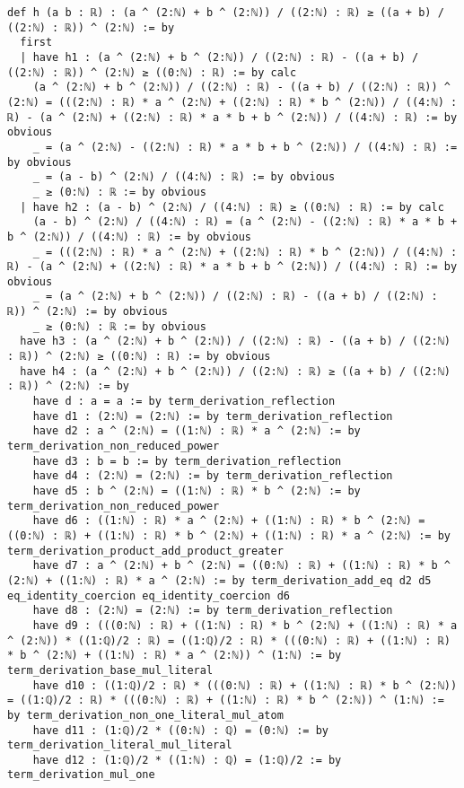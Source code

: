 \documentclass{article}
\begin{document}
\begin{tcolorbox}[colback=white!10, width=\linewidth]
\begin{lstlisting}[language=Lean4]
def h (a b : ℝ) : (a ^ (2:ℕ) + b ^ (2:ℕ)) / ((2:ℕ) : ℝ) ≥ ((a + b) / ((2:ℕ) : ℝ)) ^ (2:ℕ) := by
  first
  | have h1 : (a ^ (2:ℕ) + b ^ (2:ℕ)) / ((2:ℕ) : ℝ) - ((a + b) / ((2:ℕ) : ℝ)) ^ (2:ℕ) ≥ ((0:ℕ) : ℝ) := by calc
    (a ^ (2:ℕ) + b ^ (2:ℕ)) / ((2:ℕ) : ℝ) - ((a + b) / ((2:ℕ) : ℝ)) ^ (2:ℕ) = (((2:ℕ) : ℝ) * a ^ (2:ℕ) + ((2:ℕ) : ℝ) * b ^ (2:ℕ)) / ((4:ℕ) : ℝ) - (a ^ (2:ℕ) + ((2:ℕ) : ℝ) * a * b + b ^ (2:ℕ)) / ((4:ℕ) : ℝ) := by obvious
    _ = (a ^ (2:ℕ) - ((2:ℕ) : ℝ) * a * b + b ^ (2:ℕ)) / ((4:ℕ) : ℝ) := by obvious
    _ = (a - b) ^ (2:ℕ) / ((4:ℕ) : ℝ) := by obvious
    _ ≥ (0:ℕ) : ℝ := by obvious
  | have h2 : (a - b) ^ (2:ℕ) / ((4:ℕ) : ℝ) ≥ ((0:ℕ) : ℝ) := by calc
    (a - b) ^ (2:ℕ) / ((4:ℕ) : ℝ) = (a ^ (2:ℕ) - ((2:ℕ) : ℝ) * a * b + b ^ (2:ℕ)) / ((4:ℕ) : ℝ) := by obvious
    _ = (((2:ℕ) : ℝ) * a ^ (2:ℕ) + ((2:ℕ) : ℝ) * b ^ (2:ℕ)) / ((4:ℕ) : ℝ) - (a ^ (2:ℕ) + ((2:ℕ) : ℝ) * a * b + b ^ (2:ℕ)) / ((4:ℕ) : ℝ) := by obvious
    _ = (a ^ (2:ℕ) + b ^ (2:ℕ)) / ((2:ℕ) : ℝ) - ((a + b) / ((2:ℕ) : ℝ)) ^ (2:ℕ) := by obvious
    _ ≥ (0:ℕ) : ℝ := by obvious
  have h3 : (a ^ (2:ℕ) + b ^ (2:ℕ)) / ((2:ℕ) : ℝ) - ((a + b) / ((2:ℕ) : ℝ)) ^ (2:ℕ) ≥ ((0:ℕ) : ℝ) := by obvious
  have h4 : (a ^ (2:ℕ) + b ^ (2:ℕ)) / ((2:ℕ) : ℝ) ≥ ((a + b) / ((2:ℕ) : ℝ)) ^ (2:ℕ) := by
    have d : a = a := by term_derivation_reflection
    have d1 : (2:ℕ) = (2:ℕ) := by term_derivation_reflection
    have d2 : a ^ (2:ℕ) = ((1:ℕ) : ℝ) * a ^ (2:ℕ) := by term_derivation_non_reduced_power
    have d3 : b = b := by term_derivation_reflection
    have d4 : (2:ℕ) = (2:ℕ) := by term_derivation_reflection
    have d5 : b ^ (2:ℕ) = ((1:ℕ) : ℝ) * b ^ (2:ℕ) := by term_derivation_non_reduced_power
    have d6 : ((1:ℕ) : ℝ) * a ^ (2:ℕ) + ((1:ℕ) : ℝ) * b ^ (2:ℕ) = ((0:ℕ) : ℝ) + ((1:ℕ) : ℝ) * b ^ (2:ℕ) + ((1:ℕ) : ℝ) * a ^ (2:ℕ) := by term_derivation_product_add_product_greater
    have d7 : a ^ (2:ℕ) + b ^ (2:ℕ) = ((0:ℕ) : ℝ) + ((1:ℕ) : ℝ) * b ^ (2:ℕ) + ((1:ℕ) : ℝ) * a ^ (2:ℕ) := by term_derivation_add_eq d2 d5 eq_identity_coercion eq_identity_coercion d6
    have d8 : (2:ℕ) = (2:ℕ) := by term_derivation_reflection
    have d9 : (((0:ℕ) : ℝ) + ((1:ℕ) : ℝ) * b ^ (2:ℕ) + ((1:ℕ) : ℝ) * a ^ (2:ℕ)) * ((1:ℚ)/2 : ℝ) = ((1:ℚ)/2 : ℝ) * (((0:ℕ) : ℝ) + ((1:ℕ) : ℝ) * b ^ (2:ℕ) + ((1:ℕ) : ℝ) * a ^ (2:ℕ)) ^ (1:ℕ) := by term_derivation_base_mul_literal
    have d10 : ((1:ℚ)/2 : ℝ) * (((0:ℕ) : ℝ) + ((1:ℕ) : ℝ) * b ^ (2:ℕ)) = ((1:ℚ)/2 : ℝ) * (((0:ℕ) : ℝ) + ((1:ℕ) : ℝ) * b ^ (2:ℕ)) ^ (1:ℕ) := by term_derivation_non_one_literal_mul_atom
    have d11 : (1:ℚ)/2 * ((0:ℕ) : ℚ) = (0:ℕ) := by term_derivation_literal_mul_literal
    have d12 : (1:ℚ)/2 * ((1:ℕ) : ℚ) = (1:ℚ)/2 := by term_derivation_mul_one

\end{lstlisting}
\end{tcolorbox}
\end{document}
